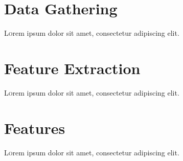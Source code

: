 \section{Data Gathering}

\lettrine[nindent=0em,lines=3]{L} orem ipsum dolor sit amet, consectetur adipiscing elit.
\lipsum[2] %

\section{Feature Extraction}

\lettrine[nindent=0em,lines=3]{L} orem ipsum dolor sit amet, consectetur adipiscing elit.
\lipsum[2] %

\section{Features}

\lettrine[nindent=0em,lines=3]{L} orem ipsum dolor sit amet, consectetur adipiscing elit.
\lipsum[2] %

